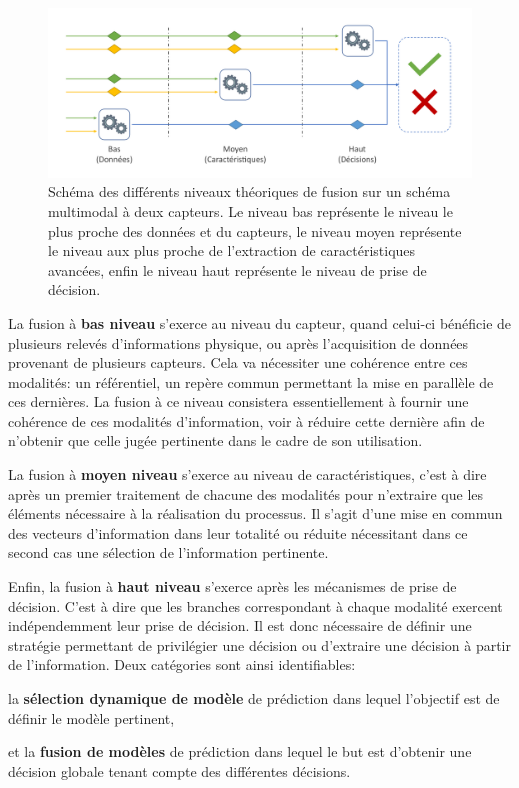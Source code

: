 \begin{figure}[H]
    \centering
    \includegraphics[width=\linewidth]{contents/chapter_3/resources/scheme_overview_fusion.pdf}
    \caption{Schéma des différents niveaux théoriques de fusion sur un schéma multimodal à deux capteurs. Le niveau bas représente le niveau le plus proche des données et du capteurs, le niveau moyen représente le niveau aux plus proche de l'extraction de caractéristiques avancées, enfin le niveau haut représente le niveau de prise de décision.}
    \label{fig:scheme_overview_fusion}
\end{figure}\par

La fusion à \textbf{bas niveau} s'exerce au niveau du capteur, quand celui-ci bénéficie de plusieurs relevés d'informations physique, ou après l'acquisition de données provenant de plusieurs capteurs. Cela va nécessiter une cohérence entre ces modalités: un référentiel, un repère commun permettant la mise en parallèle de ces dernières. La fusion à ce niveau consistera essentiellement à fournir une cohérence de ces modalités d'information, voir à réduire cette dernière afin de n'obtenir que celle jugée pertinente dans le cadre de son utilisation.\par

La fusion à \textbf{moyen niveau} s'exerce au niveau de caractéristiques, c'est à dire après un premier traitement de chacune des modalités pour n'extraire que les éléments nécessaire à la réalisation du processus. Il s'agit d'une mise en commun des vecteurs d'information dans leur totalité ou réduite nécessitant dans ce second cas une sélection de l'information pertinente.\par

Enfin, la fusion à \textbf{haut niveau} s'exerce après les mécanismes de prise de décision. C'est à dire que les branches correspondant à chaque modalité exercent indépendemment leur prise de décision. Il est donc nécessaire de définir une stratégie permettant de privilégier une décision ou d'extraire une décision à partir de l'information. Deux catégories sont ainsi identifiables: 
\begin{inlinerate}
\item la \textbf{sélection dynamique de modèle} de prédiction dans lequel l'objectif est de définir le modèle pertinent,
\item et la \textbf{fusion de modèles} de prédiction dans lequel le but est d'obtenir une décision globale tenant compte des différentes décisions.
\end{inlinerate}

